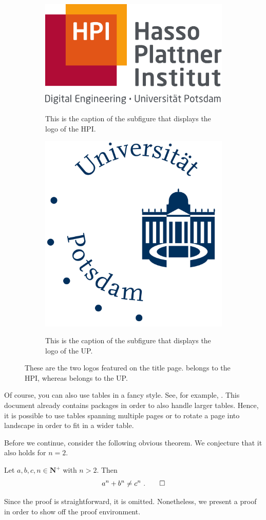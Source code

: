 \begin{figure}
    \centering
    \begin{subfigure}[b]{0.45\textwidth}
        \centering
        \includegraphics[height = 2.5 cm]{core/title_page/logo_HPI.pdf}\\[1 ex]
        \caption{This is the caption of the subfigure that displays the logo of the \textsc{HPI}.}
        \label{fig:HPI}
    \end{subfigure}
    \hfil
    \begin{subfigure}[b]{0.45\textwidth}
        \centering
        \includegraphics[height = 2.5 cm]{core/title_page/logo_UP.pdf}\\[1 ex]
        \caption{This is the caption of the subfigure that displays the logo of the UP.}
        \label{fig:UP}
    \end{subfigure}
    \caption{These are the two logos featured on the title page.  belongs to the HPI, whereas  belongs to the UP.}
    \label{fig:logos}
\end{figure}

Of course, you can also use tables in a fancy style. See, for example, . This document already contains packages in order to also handle larger tables. Hence, it is possible to use tables spanning multiple pages or to rotate a page into landscape in order to fit in a wider table.

Before we continue, consider the following obvious theorem. We conjecture that it also holds for $n = 2$.
\begin{theorem}
    \label{thm:fermatsTheorem}
    Let $a, b, c, n \in \mathbf{N}^+$ with $n > 2$. Then
    \[
        a^n + b^n \neq c^n\ .\qedhere
    \]
\end{theorem}

Since the proof is straightforward, it is omitted. Nonetheless, we present a proof in order to show off the proof environment.

